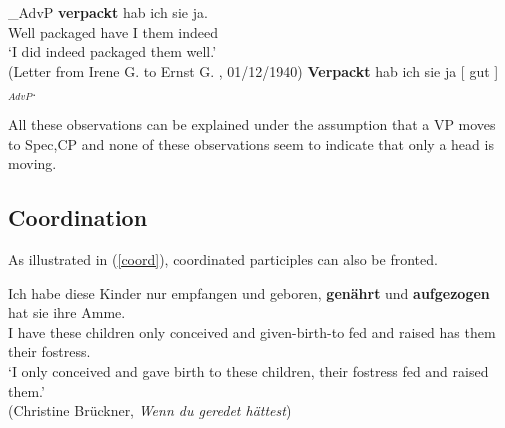 \documentclass[letterpaper,parskip=half]{scrartcl}
\begin{document}
\begin{exe}
\ex \label{advp-fronting}
\begin{xlist}
\ex \gll [ Gut ]_{AdvP} \textbf{verpackt} hab ich sie ja. \\
{} Well {} packaged have I them indeed \\
`I did indeed packaged them well.' \\
(Letter from Irene G. to Ernst G. , 01/12/1940)
\ex \textbf{Verpackt} hab ich sie ja [ gut ]$_{AdvP}$.
\end{xlist}
\end{exe}

All these observations can be explained under the assumption that a VP moves to Spec,CP and none of these observations seem to indicate that only a head is moving.








\subsection{Coordination}

As illustrated in (\ref{coord}), coordinated participles can also be fronted. 

\begin{exe}
\ex \label{coord} \gll Ich habe diese Kinder nur empfangen und geboren, \textbf{genährt} und \textbf{aufgezogen} hat sie ihre Amme. \\
I have these children only conceived and given-birth-to fed and raised has them their fostress. \\
`I only conceived and gave birth to these children, their fostress fed and raised them.' \\ 
(Christine Brückner, \textit{Wenn du geredet hättest})
\end{exe}
\end{document}
